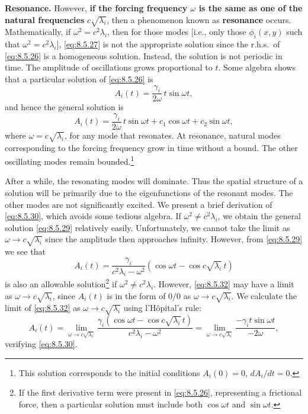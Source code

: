 \textbf{Resonance.}
However, \textbf{if the forcing frequency $\omega$ is the same as one of the natural frequencies} $c\sqrt{\lambda_i}$, then a phenomenon known as \textbf{resonance} occurs.  Mathematically, if $\omega^2 = c^2\lambda_i$, then for those modes [i.e., only those $\phi_i(x,y)$ such that $\omega^2 = c^2\lambda_i$], \eqref{eq:8.5.27} is not the appropriate solution since the r.h.s.\ of \eqref{eq:8.5.26} is a homogeneous solution.  Instead, the solution is not periodic in time.  The amplitude of oscillations grows proportional to $t$.  Some algebra shows that a particular solution of \eqref{eq:8.5.26} is
\begin{equation}
\label{eq:8.5.30}
A_i(t) = \frac{\gamma_i}{2\omega}\,t\sin\omega t,
\end{equation}
and hence the general solution is
\begin{equation}
\label{eq:8.5.31}
A_i(t) = \frac{\gamma_i}{2\omega}\,t\sin\omega t + c_1\cos\omega t + c_2\sin\omega t,
\end{equation}
where $\omega = c\sqrt{\lambda_i}$, for any mode that resonates.  At resonance, natural modes corresponding to the forcing frequency grow in time without a bound.  The other oscillating modes remain bounded.\footnote{This solution corresponds to the initial conditions $A_i(0) = 0$, $dA_i/dt = 0$.}

After a while, the resonating modes will dominate.  Thus the spatial structure of a solution will be primarily due to the eigenfunctions of the resonant modes.  The other modes are not significantly excited.  We present a brief derivation of \eqref{eq:8.5.30}, which avoids some tedious algebra.  If $\omega^2\neq c^2\lambda_i$, we obtain the general solution \eqref{eq:8.5.29} relatively easily.  Unfortunately, we cannot take the limit as $\omega\to c\sqrt{\lambda_i}$ since the amplitude then approaches infinity.  However, from \eqref{eq:8.5.29} we see that
\begin{equation}
\label{eq:8.5.32}
A_i(t) = \frac{\gamma_i}{c^2\lambda_i - \omega^2}(\cos\omega t - \cos c\sqrt{\lambda_i}\,t)
\end{equation}
is also an allowable solution\footnote{If the first derivative term were present in \eqref{eq:8.5.26}, representing a frictional force, then a particular solution must include both $\cos\omega t$ and $\sin\omega t$.} if $\omega^2\neq c^2\lambda_i$.  However, \eqref{eq:8.5.32} may have a limit as $\omega\to c\sqrt{\lambda_i}$, since $A_i(t)$ is in the form of $0/0$ as $\omega\to c\sqrt{\lambda_i}$.  We calculate the limit of \eqref{eq:8.5.32} as $\omega\to c\sqrt{\lambda_i}$ using l'H\^opital's rule:
\[
A_i(t) = \lim_{\omega\to c\sqrt{\lambda_i}} \frac{\gamma_i(\cos\omega t - \cos c\sqrt{\lambda_i}\,t)}{c^2\lambda_i - \omega^2}
= \lim_{\omega\to c\sqrt{\lambda_i}} \frac{-\gamma_i t\sin\omega t}{-2\omega},
\]
verifying \eqref{eq:8.5.30}.

